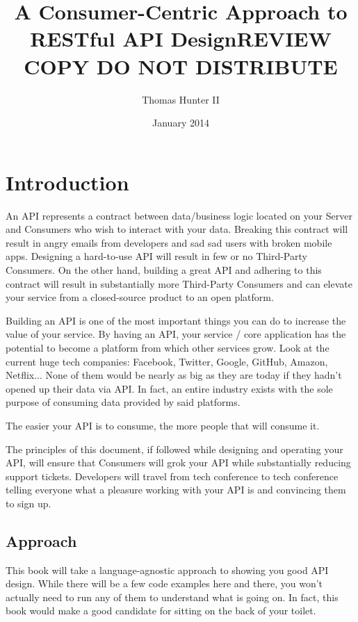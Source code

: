 \documentclass{book}
\title{A Consumer-Centric Approach to RESTful API Design\newline{}REVIEW COPY DO NOT DISTRIBUTE}
\author{Thomas Hunter II}
\date{January 2014}
\begin{document}
\maketitle

\tableofcontents

\newpage

\chapter{Introduction}

An API represents a contract between data/business logic located on your Server and Consumers who wish to interact with your data. Breaking this contract will result in angry emails from developers and sad sad users with broken mobile apps. Designing a hard-to-use API will result in few or no Third-Party Consumers. On the other hand, building a great API and adhering to this contract will result in substantially more Third-Party Consumers and can elevate your service from a closed-source product to an open platform.

Building an API is one of the most important things you can do to increase the value of your service. By having an API, your service / core application has the potential to become a platform from which other services grow. Look at the current huge tech companies: Facebook, Twitter, Google, GitHub, Amazon, Netflix... None of them would be nearly as big as they are today if they hadn't opened up their data via API. In fact, an entire industry exists with the sole purpose of consuming data provided by said platforms.

The easier your API is to consume, the more people that will consume it.

The principles of this document, if followed while designing and operating your API, will ensure that Consumers will grok your API while substantially reducing support tickets. Developers will travel from tech conference to tech conference telling everyone what a pleasure working with your API is and convincing them to sign up.

\section{Approach}

This book will take a language-agnostic approach to showing you good API design. While there will be a few code examples here and there, you won't actually need to run any of them to understand what is going on. In fact, this book would make a good candidate for sitting on the back of your toilet.
\end{document}
